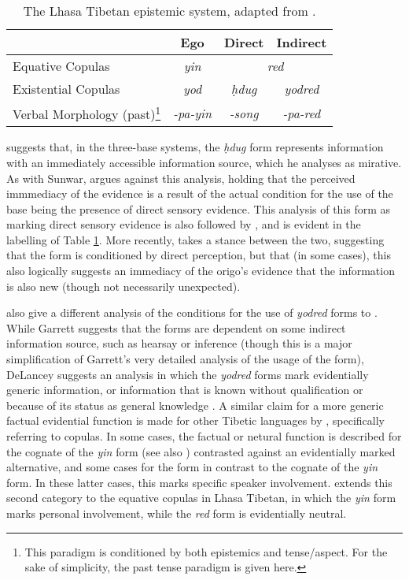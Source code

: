 \begin{table}\caption{The Lhasa Tibetan epistemic system, adapted from .}\label{t:Description:LhasaEpistemics}
  \centering
        \begin{tabular}{l|c|c|c}
         & Ego & Direct & Indirect \\ \hline
        Equative Copulas & \textit{yin} & \multicolumn{2}{c}{\textit{red}} \\
        Existential Copulas & \textit{yod} & \textit{ḥdug} & \textit{yodred} \\
        Verbal Morphology (past)\footnote{This paradigm is conditioned by both epistemics and tense/aspect. For the sake of simplicity, the past tense paradigm is given here.} & \textit{-pa-yin} & \textit{-song} & \textit{-pa-red} \\ \hline
        \end{tabular}
        
 \end{table}

 suggests that, in the three-base systems, the \textit{ḥdug} form represents information with an immediately accessible information source, which he analyses as mirative. As with Sunwar,  argues against this analysis, holding that the perceived immmediacy of the evidence is a result of the actual condition for the use of the base being the presence of direct sensory evidence. This analysis of this form as marking direct sensory evidence is also followed by , and is evident in the labelling of Table \ref{t:Description:LhasaEpistemics}. More recently,  takes a stance between the two, suggesting that the form is conditioned by direct perception, but that (in some cases), this also logically suggests an immediacy of the origo's evidence that the information is also new (though not necessarily unexpected).

 also give a different analysis of the conditions for the use of \textit{yodred} forms to . While Garrett suggests that the forms are dependent on some indirect information source, such as hearsay or inference (though this is a major simplification of Garrett's very detailed analysis of the usage of the form), DeLancey suggests an analysis in which the \textit{yodred} forms mark evidentially generic information, or information that is known without qualification or because of its status as general knowledge \cite[392]{DeLancey2017Tibetan}. A similar claim for a more generic factual evidential function is made for other Tibetic languages by , specifically referring to copulas. In some cases, the factual or netural function is described for the cognate of the \textit{yin} form (see also ) contrasted against an evidentially marked alternative, and some cases for the form in contrast to the cognate of the \textit{yin} form. In these latter cases, this marks specific speaker involvement.  extends this second category to the equative copulas in Lhasa Tibetan, in which the \textit{yin} form marks personal involvement, while the \textit{red} form is evidentially neutral.

